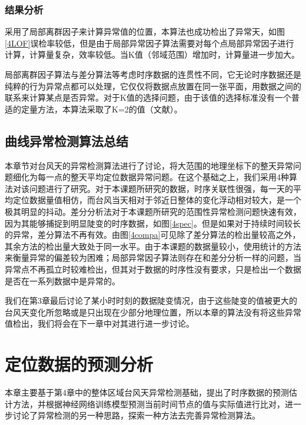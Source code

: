 \documentclass[a4paper,AutoFakeBold,oneside,12pt]{book}
\begin{document}
\subsection{结果分析}
采用了局部离群因子来计算异常值的位置，本算法也成功检出了异常天，如图\ref{4LOF}误检率较低，但是由于局部异常因子算法需要对每个点局部异常因子进行计算，计算量复杂，效率较低。当K值（邻域范围）增加时，计算量进一步加大。


局部离群因子算法与差分算法等考虑时序数据的连贯性不同，它无论时序数据还是纯粹的行为异常点都可以处理，它仅仅将数据点放置在同一张平面，用数据之间的联系来计算某点是否异常。对于K值的选择问题，由于该值的选择标准没有一个普适的定量方法，本算法采取了K=2的值（文献）。


\section{曲线异常检测算法总结}


	本章节对台风天的异常检测算法进行了讨论，将大范围的地理坐标下的整天异常问题细化为每一点的整天平均定位数据异常问题。在这个基础之上，我们采用4种算法对该问题进行了研究。对于本课题所研究的数据，时序关联性很强，每一天的平均定位数据量值相仿，而台风当天相对于邻近日整体的变化浮动相对较大，是一个极其明显的抖动。差分分析法对于本课题所研究的范围性异常检测问题快速有效，因为其能够捕捉到明显陡变的时序数据，如图\ref{4spec}。但是如果对于持续时间较长的异常，差分算法不再有效。由图\ref{4compa}可见除了差分算法的检出量较高之外，其余方法的检出量大致处于同一水平。由于本课题的数据量较小，使用统计的方法来衡量异常的偏差较为困难；局部异常因子算法则存在和差分分析一样的问题，当异常点不再孤立时较难检出，但其对于数据的时序性没有要求，只是检出一个数据是否在一系列数据中是异常的。


	我们在第3章最后讨论了某小时时刻的数据陡变情况，由于这些陡变的值被更大的台风天变化所忽略或是只出现在少部分地理位置，所以本章的算法没有将这些异常值检出，我们将会在下一章中对其进行进一步讨论。

\chapter{定位数据的预测分析}
	本章主要基于第4章中的整体区域台风天异常检测基础，提出了时序数据的预测估计方法，并根据神经网络训练模型预测当前时间节点的值与实际值进行比对，进一步讨论了异常检测的另一种思路，探索一种方法去完善异常检测算法。
\end{document}
